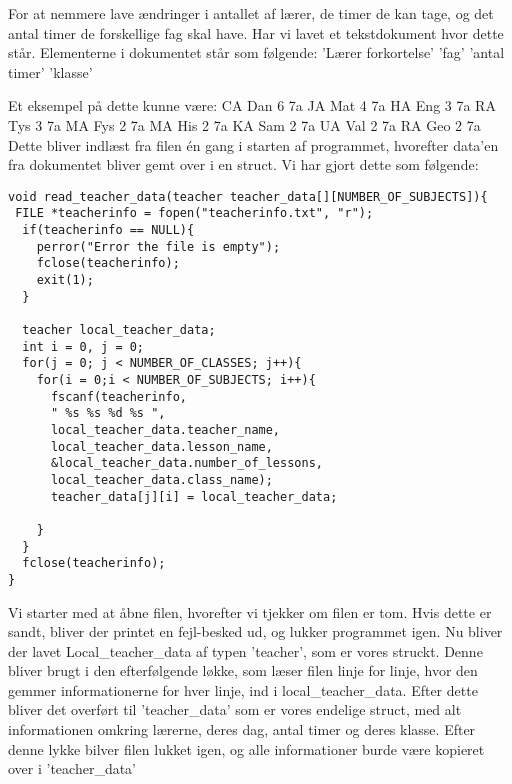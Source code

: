 For at nemmere lave ændringer i antallet af lærer, de timer de kan tage, og det antal timer de forskellige fag skal have. Har vi lavet et tekstdokument hvor dette står. 
Elementerne i dokumentet står som følgende:
’Lærer forkortelse’ ’fag’ ’antal timer’ ’klasse’

Et eksempel på dette kunne være:
    CA Dan 6 7a
    JA Mat 4 7a
    HA Eng 3 7a
    RA Tys 3 7a
    MA Fys 2 7a
    MA His 2 7a
    KA Sam 2 7a
    UA Val 2 7a
    RA Geo 2 7a
Dette bliver indlæst fra filen én gang i starten af programmet, hvorefter data’en fra dokumentet bliver gemt over i en struct.
Vi har gjort dette som følgende:
\begin{lstlisting}
void read_teacher_data(teacher teacher_data[][NUMBER_OF_SUBJECTS]){
 FILE *teacherinfo = fopen("teacherinfo.txt", "r");
  if(teacherinfo == NULL){
    perror("Error the file is empty");
    fclose(teacherinfo);
    exit(1);
  }

  teacher local_teacher_data;
  int i = 0, j = 0;
  for(j = 0; j < NUMBER_OF_CLASSES; j++){
    for(i = 0;i < NUMBER_OF_SUBJECTS; i++){
      fscanf(teacherinfo,
      " %s %s %d %s ",
      local_teacher_data.teacher_name, 
      local_teacher_data.lesson_name, 
      &local_teacher_data.number_of_lessons, 
      local_teacher_data.class_name);
      teacher_data[j][i] = local_teacher_data; 
  
    } 
  }  
  fclose(teacherinfo);
}
\end{lstlisting}
Vi starter med at åbne filen, hvorefter vi tjekker om filen er tom. Hvis dette er sandt, bliver der printet en fejl-besked ud, og lukker programmet igen.
Nu bliver der lavet Local_teacher_data af typen ’teacher’, som er vores struckt. Denne bliver brugt i den efterfølgende løkke, som læser filen linje for linje, hvor den gemmer informationerne for hver linje, ind i local_teacher_data. Efter dette bliver det overført til ’teacher_data’ som er vores endelige struct, med alt informationen omkring lærerne, deres dag, antal timer og deres klasse. 
Efter denne lykke bilver filen lukket igen, og alle informationer burde være kopieret over i ’teacher_data’
